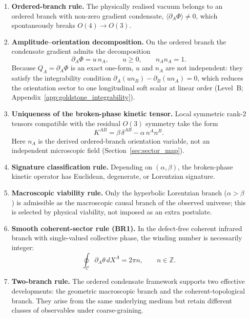 \documentclass[11pt,a4paper]{article}
\numberwithin{equation}{section}
\begin{document}
\begin{enumerate}
  \item \textbf{Ordered-branch rule.}
  The physically realised vacuum belongs to an ordered branch with
  non-zero gradient condensate,
  $\langle \partial_A\Phi\rangle \neq 0$,
  which spontaneously breaks $O(4)\to O(3)$.

  \item \textbf{Amplitude--orientation decomposition.}
  On the ordered branch the condensate gradient admits the decomposition
  \[
  \partial_A\Phi = u\,n_A,
  \qquad
  u\ge 0,
  \qquad
  n_A n_A = 1.
  \]
  Because $Q_A=\partial_A\Phi$ is an exact one-form, $u$ and $n_A$
  are not independent: they satisfy the integrability condition
  $\partial_A(u n_B)-\partial_B(u n_A)=0$, which reduces the
  orientation sector to one longitudinal soft scalar at linear order
  (Level~B; Appendix~\ref{app:goldstone_integrability}).

  \item \textbf{Uniqueness of the broken-phase kinetic tensor.}
  Local symmetric rank-2 tensors compatible with the residual $O(3)$
  symmetry take the form
  \[
  K^{AB}=\beta\,\delta^{AB}-\alpha\,n^A n^B.
  \]
  Here $n_A$ is the derived ordered-branch orientation variable,
  not an independent microscopic field (Section~\ref{sec:sector_map}).

  \item \textbf{Signature classification rule.}
  Depending on $(\alpha,\beta)$, the broken-phase kinetic operator has
  Euclidean, degenerate, or Lorentzian signature.

  \item \textbf{Macroscopic viability rule.}
  Only the hyperbolic Lorentzian branch ($\alpha>\beta$) is admissible
  as the macroscopic causal branch of the observed universe; this is
  selected by physical viability, not imposed as an extra postulate.

  \item \textbf{Smooth coherent-sector rule (BR1).}
  In the defect-free coherent infrared branch with single-valued
  collective phase, the winding number is necessarily integer:
  \[
  \oint_{\mathcal{C}}\partial_A\theta\,dX^A = 2\pi n,
  \qquad n\in\mathbb{Z}.
  \]

  \item \textbf{Two-branch rule.}
  The ordered condensate framework supports two effective developments:
  the geometric macroscopic branch and the coherent-topological branch.
  They arise from the same underlying medium but retain different
  classes of observables under coarse-graining.
\end{enumerate}
\end{document}
